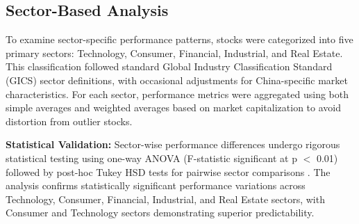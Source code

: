 \documentclass[3p,times,procedia]{elsarticle}
\begin{document}
\subsection{Sector-Based Analysis}
To examine sector-specific performance patterns, stocks were categorized into five primary sectors: Technology, Consumer, Financial, Industrial, and Real Estate. This classification followed standard Global Industry Classification Standard (GICS) sector definitions, with occasional adjustments for China-specific market characteristics. For each sector, performance metrics were aggregated using both simple averages and weighted averages based on market capitalization to avoid distortion from outlier stocks.

\begin{table}[!ht]
\centering
\caption{\textbf{Sector-wise Average Performance Metrics}}
\end{table}

\textbf{Statistical Validation:} Sector-wise performance differences undergo rigorous statistical testing using one-way ANOVA (F-statistic significant at p $<$ 0.01) followed by post-hoc Tukey HSD tests for pairwise sector comparisons \cite{Box1970,Tukey1949}. The analysis confirms statistically significant performance variations across Technology, Consumer, Financial, Industrial, and Real Estate sectors, with Consumer and Technology sectors demonstrating superior predictability.
\end{document}
